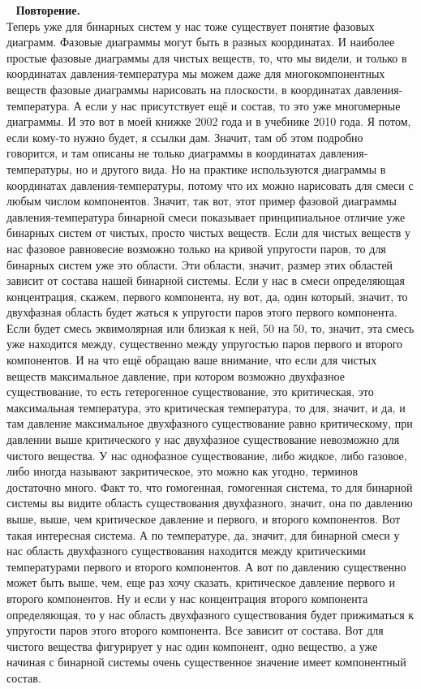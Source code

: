 \documentclass[main.tex]{subfiles}
\begin{document}
\ \newline
\textbf{Повторение.}\\
Теперь уже для бинарных систем у нас тоже существует понятие фазовых диаграмм.
Фазовые диаграммы могут быть в разных координатах.
И наиболее простые фазовые диаграммы для чистых веществ, то, что мы видели, и только в координатах давления-температура мы можем даже для многокомпонентных веществ фазовые диаграммы нарисовать на плоскости, в координатах давления-температура.
А если у нас присутствует ещё и состав, то это уже многомерные диаграммы.
И это вот в моей книжке 2002 года и в учебнике 2010 года.
Я потом, если кому-то нужно будет, я ссылки дам.
Значит, там об этом подробно говорится, и там описаны не только диаграммы в координатах давления-температуры, но и другого вида.
Но на практике используются диаграммы в координатах давления-температуры, потому что их можно нарисовать для смеси с любым числом компонентов.
Значит, так вот, этот пример фазовой диаграммы давления-температура бинарной смеси показывает принципиальное отличие уже бинарных систем от чистых, просто чистых веществ.
Если для чистых веществ у нас фазовое равновесие возможно только на кривой упругости паров, то для бинарных систем уже это области.
Эти области, значит, размер этих областей зависит от состава нашей бинарной системы.
Если у нас в смеси определяющая концентрация, скажем, первого компонента, ну вот, да, один который, значит, то двухфазная область будет жаться к упругости паров этого первого компонента.
Если будет смесь эквимолярная или близкая к ней, 50 на 50, то, значит, эта смесь уже находится между, существенно между упругостью паров первого и второго компонентов.
И на что ещё обращаю ваше внимание, что если для чистых веществ максимальное давление, при котором возможно двухфазное существование, то есть гетерогенное существование, это критическая, это максимальная температура, это критическая температура, то для, значит, и да, и там давление максимальное двухфазного существование равно критическому, при давлении выше критического у нас двухфазное существование невозможно для чистого вещества.
У нас однофазное существование, либо жидкое, либо газовое, либо иногда называют закритическое, это можно как угодно, терминов достаточно много.
Факт то, что гомогенная, гомогенная система, то для бинарной системы вы видите область существования двухфазного, значит, она по давлению выше, выше, чем критическое давление и первого, и второго компонентов.
Вот такая интересная система.
А по температуре, да, значит, для бинарной смеси
у нас область двухфазного существования находится между критическими температурами первого и второго компонентов.
А вот по давлению существенно может быть выше, чем, еще раз хочу сказать, критическое давление первого и второго компонентов.
Ну и если у нас концентрация второго компонента определяющая, то у нас область двухфазного существования будет прижиматься к упругости паров этого второго компонента.
Все зависит от состава.
Вот для чистого вещества фигурирует у нас один компонент, одно вещество, а уже начиная с бинарной системы очень существенное значение имеет компонентный состав.
\end{document}

